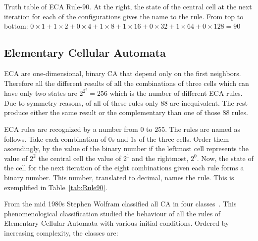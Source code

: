 \begin{table}
\caption{Truth table of ECA Rule-$90$. At the right, the state of the central cell at the next iteration for each of the configurations gives the name to the rule. From top to bottom: $0\times1 + 1\times2 + 0\times4 + 1\times8 + 1\times16 + 0\times32 + 1\times64 + 0\times128 = 90$  }
\label{tab:Rule90}

\end{table}









\subsection{Elementary Cellular Automata}

ECA are one-dimensional, binary CA that depend only on the first neighbors. Therefore all the different results of all the combinations of three cells which can have only two states are $2^{2^3} = 256$ which is the number of different ECA rules. Due to symmetry reasons, of all of these rules only $88$ are inequivalent. The rest produce either the same result or the complementary than one of those $88$ rules. 




ECA rules are recognized by a number from $0$ to $255$. The rules are named as follows. Take each combination of 0s and 1s of the three cells. Order them ascendingly, by the value of the binary number if the leftmost cell represents the value of $2^2$ the central cell the value of $2^1$ and the rightmost, $2^0$. Now, the state of the cell for the next iteration of the eight combinations given each rule forms a binary number. This number, translated to decimal, names the rule. This is exemplified in Table~\ref{tab:Rule90}.


From the mid 1980s Stephen Wolfram classified all CA in four classes~\cite{WolframCA_ClassOrigen}. This phenomenological classification studied the behaviour of all the rules of Elementary Cellular Automata with various initial conditions. Ordered by increasing complexity, the classes are:





